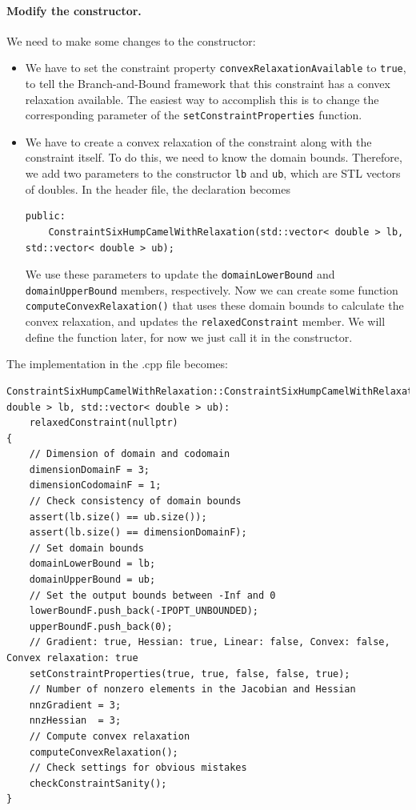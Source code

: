 \paragraph{Modify the constructor.} We need to make some changes to the constructor:
\begin{itemize}
\item We have to set the constraint property \texttt{convexRelaxationAvailable} to \texttt{true}, to tell the Branch-and-Bound framework that this constraint has a convex relaxation available. The easiest way to accomplish this is to change the corresponding parameter of the \texttt{setConstraintProperties} function.
\item We have to create a convex relaxation of the constraint along with the constraint itself. To do this, we need to know the domain bounds. Therefore, we add two parameters to the constructor \texttt{lb} and \texttt{ub}, which are STL vectors of doubles. In the header file, the declaration becomes
\begin{lstlisting}
public:
	ConstraintSixHumpCamelWithRelaxation(std::vector< double > lb, std::vector< double > ub);
\end{lstlisting}
We use these parameters to update the \texttt{domainLowerBound} and \texttt{domainUpperBound} members, respectively. Now we can create some function \texttt{computeConvexRelaxation()} that uses these domain bounds to calculate the convex relaxation, and updates the \texttt{relaxedConstraint} member. We will define the function later, for now we just call it in the constructor.
\end{itemize}
The implementation in the .cpp file becomes:
\begin{lstlisting}
ConstraintSixHumpCamelWithRelaxation::ConstraintSixHumpCamelWithRelaxation(std::vector< double > lb, std::vector< double > ub):
	relaxedConstraint(nullptr)
{
	// Dimension of domain and codomain 
	dimensionDomainF = 3;
	dimensionCodomainF = 1;
	// Check consistency of domain bounds
	assert(lb.size() == ub.size());
	assert(lb.size() == dimensionDomainF);
	// Set domain bounds
	domainLowerBound = lb;
	domainUpperBound = ub;
	// Set the output bounds between -Inf and 0
	lowerBoundF.push_back(-IPOPT_UNBOUNDED);
	upperBoundF.push_back(0);
	// Gradient: true, Hessian: true, Linear: false, Convex: false, Convex relaxation: true
	setConstraintProperties(true, true, false, false, true);
	// Number of nonzero elements in the Jacobian and Hessian
	nnzGradient = 3;
	nnzHessian  = 3;
	// Compute convex relaxation
	computeConvexRelaxation();
	// Check settings for obvious mistakes
	checkConstraintSanity();
}
\end{lstlisting}

